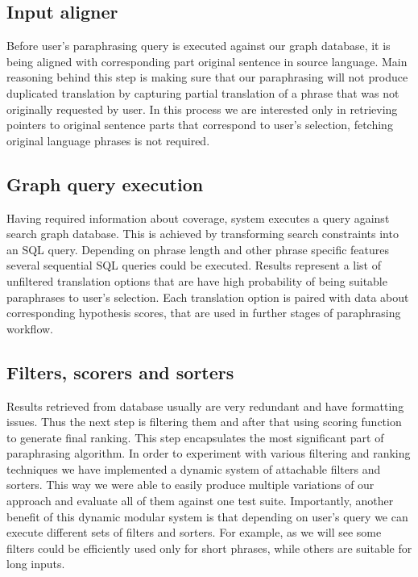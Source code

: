\subsection{Input aligner}

Before user's paraphrasing query is executed against our graph database, it is being aligned with corresponding part original sentence in source language. Main reasoning behind this step is making sure that our paraphrasing will not produce duplicated translation by capturing partial translation of a phrase that was not originally requested by user. In this process we are interested only in retrieving pointers to original sentence parts that correspond to user's selection, fetching original language phrases is not required.

\subsection{Graph query execution}

Having required information about coverage, system executes a query against search graph database. This is achieved by transforming search constraints into an SQL query. Depending on phrase length and other phrase specific features several sequential SQL queries could be executed. Results represent a list of unfiltered translation options that are have high probability of being suitable paraphrases to user's selection. Each translation option is paired with data about corresponding hypothesis scores, that are used in further stages of paraphrasing workflow.

\subsection{Filters, scorers and sorters}

Results retrieved from database usually are very redundant and have formatting issues. Thus the next step is filtering them and after that using scoring function to generate final ranking. This step encapsulates the most significant part of paraphrasing algorithm. In order to experiment with various filtering and ranking techniques we have implemented a dynamic system of attachable filters and sorters. This way we were able to easily produce multiple variations of our approach and evaluate all of them against one test suite. Importantly, another benefit of this dynamic modular system is that depending on user's query we can execute different sets of filters and sorters. For example, as we will see some filters could be efficiently used only for short phrases, while others are suitable for long inputs. 

